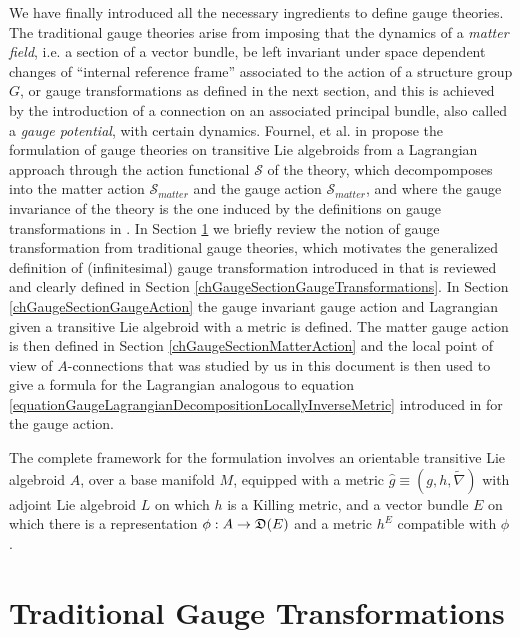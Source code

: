 We have finally introduced all the necessary ingredients to define gauge theories. The traditional gauge theories arise from imposing that the dynamics of a \emph{matter field}, i.e. a section of a vector bundle, be left invariant under space dependent changes of ``internal reference frame'' associated to the action of a structure group $G$, or gauge transformations as defined in the next section, and this is achieved by the introduction of a connection on an associated principal bundle, also called a \emph{gauge potential}, with certain dynamics. Fournel, et al. in \cite{Fournel2013} propose the formulation of gauge theories on transitive Lie algebroids from a Lagrangian approach through the action functional $\mathcal S$ of the theory, which decompomposes into the matter action $\mathcal S_{matter}$ and the gauge action $\mathcal S_{matter}$, and where the gauge invariance of the theory is the one induced by the definitions on gauge transformations in \cite{Lazzarini2012}. In Section \ref{chGaugeSectionTraditional} we briefly review the notion of gauge transformation from traditional gauge theories, which motivates the generalized definition of (infinitesimal) gauge transformation introduced in \cite{Lazzarini2012} that is reviewed and clearly defined in Section \ref{chGaugeSectionGaugeTransformations}. In Section \ref{chGaugeSectionGaugeAction} the gauge invariant gauge action and Lagrangian given a transitive Lie algebroid with a metric is defined. The matter gauge action is then defined in Section \ref{chGaugeSectionMatterAction} and the local point of view of $A$-connections that was studied by us in this document is then used to give a formula for the Lagrangian analogous to equation \eqref{equationGaugeLagrangianDecompositionLocallyInverseMetric} introduced in \cite{Fournel2013} for the gauge action.

The complete framework for the formulation involves an orientable transitive Lie algebroid $A$, over a base manifold $M$, equipped with a metric $\hat g \equiv (g, h, \tilde \nabla)$ with adjoint Lie algebroid $L$ on which $h$ is a Killing metric, and a vector bundle $E$ on which there is a representation $\phi: A \to \alg D(E)$ and a metric $h^E$ compatible with $\phi$.

\section{Traditional Gauge Transformations}
\label{chGaugeSectionTraditional}


